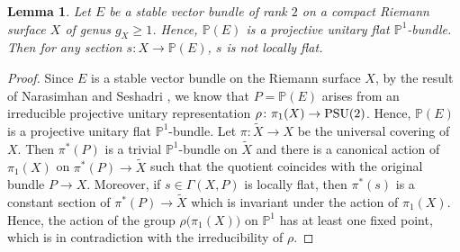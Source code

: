 \documentclass[12pt]{article}
\newtheorem{lem}{Lemma}[section]
\begin{document}
\begin{lem}
\label{lem:nonflat}
Let $E$ be a stable vector bundle of rank $2$ on a compact Riemann surface $X$ of genus $g_{X} \geq 1$. Hence, $\mathbb P(E)$ is a projective unitary flat $\mathbb P^{1}$-bundle. Then for any section $s \colon X \to \mathbb P(E)$, $s$ is {\rm not} locally flat.
\end{lem}
\begin{proof}
Since $E$ is a stable vector bundle on the Riemann surface $X$,  by the result of Narasimhan and Seshadri \cite{NS1965}, we know that $P = \mathbb P(E)$ arises from an irreducible projective unitary representation $\rho \colon \pi_{1}(X) \to {\rm PSU}(2)$. Hence, $\mathbb P(E)$ is a projective unitary flat $\mathbb P^{1}$-bundle. Let $\pi \colon \widetilde{X} \to X$ be the universal covering of $X$. Then $\pi^{*}(P)$ is a trivial $\mathbb P^{1}$-bundle on $\widetilde{X}$ and there is a canonical action of $\pi_{1}(X)$ on $\pi^{*}(P)\to \widetilde{X}$ such that the quotient  coincides with the original bundle $P\to X$. Moreover, if $s \in \Gamma(X, P)$ is locally flat, then $\pi^{*}(s)$ is a constant section of $\pi^{*}(P) \to \widetilde{X}$ which is invariant under the action of $\pi_{1}(X)$. Hence, the action of the group $\rho\big(\pi_{1}(X)\big)$ on $\mathbb P^{1}$ has at least one fixed point, which is in contradiction with the irreducibility of $\rho$.
\end{proof}
\end{document}
